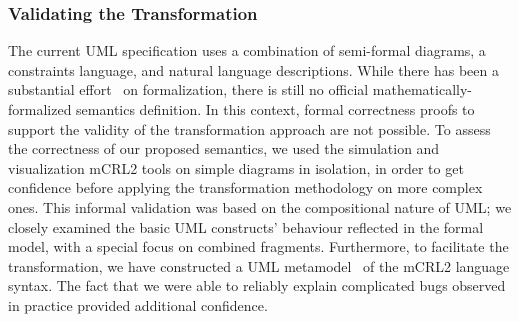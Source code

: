 \documentclass[letter]{llncs}
\newcommand{\secshrink}{\vspace{-.5cm}}
\newcommand{\subsecshrinkbegin}{\vspace{-.2cm}}
\begin{document}
\subsubsection{Validating the Transformation}
\subsecshrinkbegin
\vspace{-9 pt}
The current UML specification uses a combination of semi-formal diagrams, a constraints language, and natural language descriptions.
While there has been a substantial effort~\cite{Broy:2006:USS:1762828.1762881,lazuar2010tool,Diskin06mappings} on formalization, 
there is still no official mathematically-formalized semantics definition. 
In this context, formal correctness proofs to support the validity of the transformation approach are not possible.
To assess the correctness of our proposed semantics, we used the simulation and visualization mCRL2 tools on
simple diagrams in isolation, in order to get confidence before applying the transformation methodology on
more complex ones. This informal validation was based on the compositional nature of UML; we closely 
examined the basic UML constructs' behaviour reflected in the formal model, with a special focus on combined fragments.
Furthermore, to facilitate the transformation, we have constructed a UML metamodel~\cite{repo:remenska} of the mCRL2 language syntax.
The fact that we were able to reliably explain complicated bugs observed in practice provided additional confidence.
%
% 
\secshrink
\end{document}
